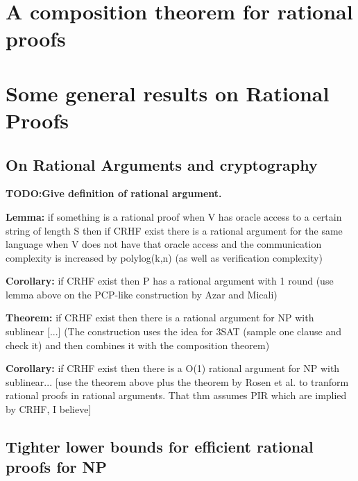
\section{A composition theorem for rational proofs}


\section{Some general results on Rational Proofs}

\subsection{On Rational Arguments and cryptography}

\textbf{ TODO:Give definition of rational argument.}

\textbf{Lemma: }if something is a rational proof when V has oracle access to a certain string of length S then if CRHF exist there is a rational argument for the same language when V does not have that oracle access and the communication complexity is increased by polylog(k,n) (as well as verification complexity) %

\textbf{Corollary: }if CRHF exist then P has a rational argument with 1 round (use lemma above on the PCP-like construction by Azar and Micali)

\textbf{Theorem: }if CRHF exist  then there is a rational argument for NP with sublinear [...] 
(The construction uses the idea for 3SAT (sample one clause and check it) and then combines it with the composition theorem)

\textbf{ Corollary: } if CRHF exist then there is a O(1) rational argument for NP with sublinear... [use the theorem above plus the theorem by Rosen et al. to tranform rational proofs in rational arguments. That thm assumes PIR which are implied by CRHF, I believe]


\subsection{Tighter lower bounds for efficient rational proofs for NP}

